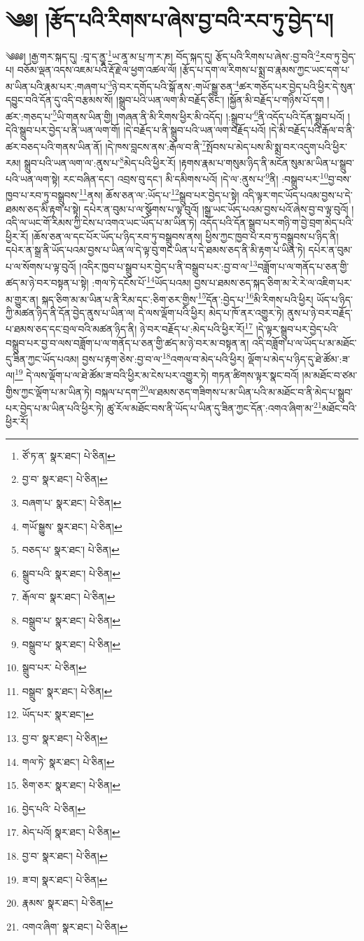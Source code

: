 \setcounter{footnote}{0} 
\chapter{༄༅། །རྩོད་པའི་རིགས་པ་ཞེས་བྱ་བའི་རབ་ཏུ་བྱེད་པ།}༄༅༅། །རྒྱ་གར་སྐད་དུ། :བཱ་ད་ནྱཱ་\footnote{ཙོ་ཏ་ན་  སྣར་ཐང་།  པེ་ཅིན། }ཡ་ནཱ་མ་པྲ་ཀ་ར་ཎ། བོད་སྐད་དུ། རྩོད་པའི་རིགས་པ་ཞེས་:བྱ་བའི་\footnote{བྱ་བ་  སྣར་ཐང་།  པེ་ཅིན། }རབ་ཏུ་བྱེད་པ། བཅོམ་ལྡན་འདས་འཇམ་པའི་རྡོ་རྗེ་ལ་ཕྱག་འཚལ་ལོ། །རྩོད་པ་དག་ལ་རིགས་པ་སྨྲ་བ་རྣམས་ཀྱང་ཡང་དག་པ་མ་ཡིན་པའི་རྣམ་པར་:གཞག་པ་\footnote{བཞག་པ་  སྣར་ཐང་།  པེ་ཅིན། }ཉེ་བར་དགོད་པའི་སྒོ་ནས་:གཡོ་སྒྱུ་ཅན་\footnote{གཡོ་སྒྱུས་  སྣར་ཐང་།  པེ་ཅིན། }ཚར་གཅོད་པར་བྱེད་པའི་ཕྱིར་དེ་སུན་དབྱུང་བའི་དོན་དུ་འདི་བརྩམས་སོ། །སྒྲུབ་པའི་ཡན་ལག་མི་བརྗོད་ཅིང་། །སྐྱོན་མི་བརྗོད་པ་གཉིས་པོ་དག །ཚར་:གཅད་པ་\footnote{བཅད་པ་  སྣར་ཐང་།  པེ་ཅིན། }ཡི་གནས་ཡིན་གྱི། །གཞན་ནི་མི་རིགས་ཕྱིར་མི་འདོད། །:སྒྲུབ་པ་\footnote{སྒྲུབ་པའི་  སྣར་ཐང་།  པེ་ཅིན། }ནི་འདོད་པའི་དོན་སྒྲུབ་པའོ། །དེའི་སྒྲུབ་པར་བྱེད་པ་ནི་ཡན་ལག་གོ། །དེ་བརྗོད་པ་ནི་སྒྲུབ་པའི་ཡན་ལག་བརྗོད་པའོ། །དེ་མི་བརྗོད་པའི་རྒོལ་བ་ནི་ཚར་བཅད་པའི་གནས་ཡིན་ནོ། །དེ་ཁས་བླངས་ནས་:རྒོལ་བ་ནི་\footnote{རྒོལ་བ་  སྣར་ཐང་།  པེ་ཅིན། }སྤོབས་པ་མེད་པས་མི་སྨྲ་བར་འདུག་པའི་ཕྱིར་རམ། སྒྲུབ་པའི་ཡན་ལག་ལ་:ནུས་པ་\footnote{བསྒྲུབ་པ་  སྣར་ཐང་།  པེ་ཅིན། }མེད་པའི་ཕྱིར་རོ། །རྟགས་རྣམ་པ་གསུམ་ཉིད་ནི་མངོན་སུམ་མ་ཡིན་པ་སྒྲུབ་པའི་ཡན་ལག་སྟེ། རང་བཞིན་དང་། འབྲས་བུ་དང་། མི་དམིགས་པའོ། །དེ་ལ་:ནུས་པ་\footnote{བསྒྲུབ་པ་  སྣར་ཐང་།  པེ་ཅིན། }ནི། :བསྒྲུབ་པར་\footnote{སྒྲུབ་པར་  པེ་ཅིན། }བྱ་བས་ཁྱབ་པ་རབ་ཏུ་བསྒྲུབས་\footnote{བསྒྲུབ་  སྣར་ཐང་།  པེ་ཅིན། }ནས། ཆོས་ཅན་ལ་:ཡོད་པ་\footnote{ཡོད་པར་  སྣར་ཐང་། }སྒྲུབ་པར་བྱེད་པ་སྟེ། འདི་ལྟར་གང་ཡོད་པའམ་བྱས་པ་དེ་ཐམས་ཅད་མི་རྟག་པ་སྟེ། དཔེར་ན་བུམ་པ་ལ་སྩོགས་པ་ལྟ་བུའོ། །སྒྲ་ཡང་ཡོད་པའམ་བྱས་པའོ་ཞེས་བྱ་བ་ལྟ་བུའོ། །འདི་ལ་ཡང་གོ་རིམས་ཀྱི་ངེས་པ་འགའ་ཡང་ཡོད་པ་མ་ཡིན་ཏེ། འདོད་པའི་དོན་སྒྲུབ་པར་གཉི་ག་བྱེ་བྲག་མེད་པའི་ཕྱིར་རོ། །ཆོས་ཅན་ལ་དང་པོར་ཡོད་པ་ཉིད་རབ་ཏུ་བསྒྲུབས་ནས། ཕྱིས་ཀྱང་ཁྱབ་པ་རབ་ཏུ་བསྒྲུབས་པ་ཉིད་ནི། དཔེར་ན་སྒྲ་ནི་ཡོད་པའམ་བྱས་པ་ཡིན་ལ་དེ་ལྟ་བུ་གང་ཡིན་པ་དེ་ཐམས་ཅད་ནི་མི་རྟག་པ་ཡིན་ཏེ། དཔེར་ན་བུམ་པ་ལ་སོགས་པ་ལྟ་བུའོ། །འདིར་ཁྱབ་པ་སྒྲུབ་པར་བྱེད་པ་ནི་བསྒྲུབ་པར་:བྱ་བ་ལ་\footnote{བྱ་བ་  སྣར་ཐང་།  པེ་ཅིན། }བཟློག་པ་ལ་གནོད་པ་ཅན་གྱི་ཚད་མ་ཉེ་བར་བསྟན་པ་སྟེ། :གལ་ཏེ་དངོས་པོ་\footnote{གལ་ཏེ་  སྣར་ཐང་།  པེ་ཅིན། }ཡོད་པའམ། བྱས་པ་ཐམས་ཅད་སྐད་ཅིག་མ་རེ་རེ་ལ་འཇིག་པར་མ་གྱུར་ན། སྐད་ཅིག་མ་མ་ཡིན་པ་ནི་རིམ་དང་:ཅིག་ཅར་གྱིས་\footnote{ཅིག་ཅར་  སྣར་ཐང་།  པེ་ཅིན། }དོན་:བྱེད་པ་\footnote{བྱེད་པའི་  པེ་ཅིན། }མི་རིགས་པའི་ཕྱིར། ཡོད་པ་ཉིད་ཀྱི་མཚན་ཉིད་ནི་དོན་བྱེད་ནུས་པ་ཡིན་ལ། དེ་ལས་ལྡོག་པའི་ཕྱིར། མེད་པ་ཁོ་ནར་འགྱུར་ཏེ། ནུས་པ་ཉེ་བར་བརྗོད་པ་ཐམས་ཅད་དང་བྲལ་བའི་མཚན་ཉིད་ནི། ཉེ་བར་བརྗོད་པ་:མེད་པའི་ཕྱིར་རོ།\footnote{མེད་པའོ།  སྣར་ཐང་།  པེ་ཅིན། } །དེ་ལྟར་སྒྲུབ་པར་བྱེད་པའི་བསྒྲུབ་པར་བྱ་བ་ལས་བཟློག་པ་ལ་གནོད་པ་ཅན་གྱི་ཚད་མ་ཉེ་བར་མ་བསྟན་ན། འདི་བཟློག་པ་ལ་ཡོད་པ་མ་མཐོང་དུ་ཟིན་ཀྱང་ཡོད་པའམ། བྱས་པ་རྟག་ཅེས་:བྱ་བ་ལ་\footnote{བྱ་བ་  སྣར་ཐང་།  པེ་ཅིན། }འགལ་བ་མེད་པའི་ཕྱིར། ལྡོག་པ་མེད་པ་ཉིད་དུ་ཐེ་ཚོམ་:ཟ་ལ།\footnote{ཟ་བ།  སྣར་ཐང་།  པེ་ཅིན། } དེ་ལས་ལྡོག་པ་ལ་ཐེ་ཚོམ་ཟ་བའི་ཕྱིར་མ་ངེས་པར་འགྱུར་ཏེ། གཏན་ཚིགས་ལྟར་སྣང་བའོ། །མ་མཐོང་བ་ཙམ་གྱིས་ཀྱང་ལྡོག་པ་མ་ཡིན་ཏེ། བསྐལ་པ་དག་\footnote{རྣམས་  སྣར་ཐང་།  པེ་ཅིན། }ལ་ཐམས་ཅད་གཟིགས་པ་མ་ཡིན་པའི་མ་མཐོང་བ་ནི་མེད་པ་སྒྲུབ་པར་བྱེད་པ་མ་ཡིན་པའི་ཕྱིར་ཏེ། ཚུ་རོལ་མཐོང་བས་ནི་ཡོད་པ་ཡིན་དུ་ཟིན་ཀྱང་དོན་:འགའ་ཞིག་མ་\footnote{འགའ་ཞིག་  སྣར་ཐང་།  པེ་ཅིན། }མཐོང་བའི་ཕྱིར་རོ། 